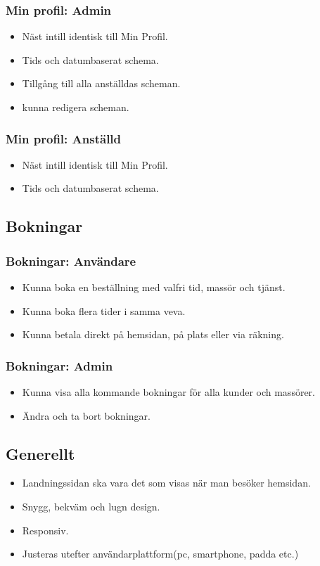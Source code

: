 \documentclass[11pt, titlepage, oneside, a4paper]{article}	%
\begin{document}
	\subsubsection*{Min profil: Admin}
	\begin{itemize}
		\item Näst intill identisk till Min Profil.
		\item Tids och datumbaserat schema.
		\item Tillgång till alla anställdas scheman.
		\item kunna redigera scheman.
	\end{itemize}
	\subsubsection*{Min profil: Anställd}
	\begin{itemize}
		\item Näst intill identisk till Min Profil.
		\item Tids och datumbaserat schema.
	\end{itemize}
	
\subsection{Bokningar}
	\subsubsection*{Bokningar: Användare}
	\begin{itemize}
		\item Kunna boka en beställning med valfri tid, massör och tjänst.
		\item Kunna boka flera tider i samma veva.
		\item Kunna betala direkt på hemsidan, på plats eller via räkning.
	\end{itemize}
	\subsubsection*{Bokningar: Admin}
	\begin{itemize}
		\item Kunna visa alla kommande bokningar för alla kunder och massörer.
		\item Ändra och ta bort bokningar.
	\end{itemize}
	
\subsection{Generellt}
\begin{itemize}
	\item Landningssidan ska vara det som visas när man besöker hemsidan.
	\item Snygg, bekväm och lugn design.
	\item Responsiv.
	\item Justeras utefter användarplattform(pc, smartphone, padda etc.)
\end{itemize}
\end{document}
